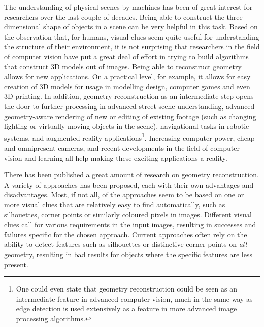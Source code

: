 
The understanding of physical scenes by machines has been of great interest for researchers over the last couple of decades. Being able to construct the three dimensional shape of objects in a scene can be very helpful in this task. Based on the observation that, for humans, visual clues seem quite useful for understanding the structure of their environment, it is not surprising that researchers in the field of computer vision have put a great deal of effort in trying to build algorithms that construct 3D models out of images. Being able to reconstruct geometry allows for new applications. On a practical level, for example, it allows for easy creation of 3D models for usage in modelling design, computer games and even 3D printing. In addition, geometry reconstruction as an intermediate step opens the door to further processing in advanced street scene understanding, advanced geometry-aware rendering of new or editing of existing footage (such as changing lighting or virtually moving objects in the scene), navigational tasks in robotic systems, and augmented reality applications\footnote{One could even state that geometry reconstruction could be seen as an intermediate feature in advanced computer vision, much in the same way as edge detection is used extensively as a feature in more advanced image processing algorithms.}. Increasing computer power, cheap and omnipresent cameras, and recent developments in the field of computer vision and learning all help making these exciting applications a reality.

There has been published a great amount of research on geometry reconstruction. A variety of approaches has been proposed, each with their own advantages and disadvantages. Most, if not all, of the approaches seem to be based on one or more visual clues that are relatively easy to find automatically, such as silhouettes, corner points or similarly coloured pixels in images. Different visual clues call for various requirements in the input images, resulting in successes and failures specific for the chosen approach. Current approaches often rely on the ability to detect features such as silhouettes or distinctive corner points on \emph{all} geometry, resulting in bad results for objects where the specific features are less present.

